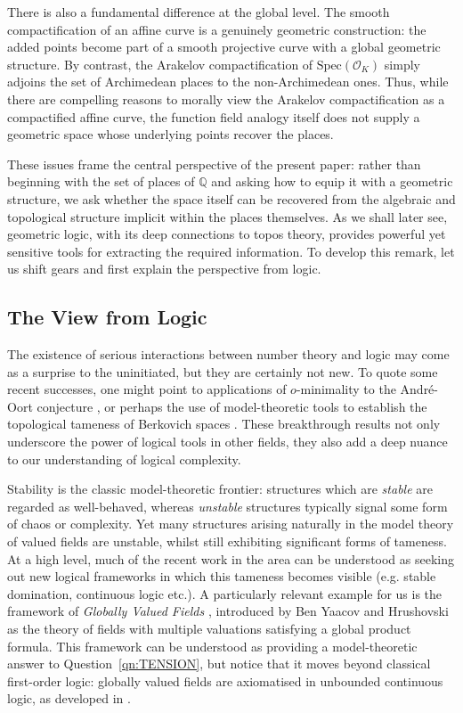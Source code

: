 \documentclass[a4paper, 11pt,reqno]{amsart}
\newcommand{\calO}{{\mathcal{O}}}
\newcommand{\Spec}{\mathrm{Spec}}
\newcommand{\Q}{\mathbb{Q}}
\newcommand{\EXP}[1]{{\color{teal} {\tiny \bf (Exposition:)} {\bf #1}}}
\begin{document}
 There is also a fundamental difference at the global level. The smooth compactification of an affine curve is a genuinely geometric construction: the added points become part of a smooth projective curve with a global geometric structure. By contrast, the Arakelov compactification of $\Spec(\calO_K)$ simply adjoins the set of Archimedean places to the non-Archimedean ones. Thus, while there are compelling reasons to morally view the Arakelov compactification as a compactified affine curve, the function field analogy itself does not supply a geometric space whose underlying points recover the places. 
 
 

These issues frame the central perspective of the present paper: rather than beginning with the set of places of $\Q$ and asking how to equip it with a geometric structure, we ask whether the space itself can be recovered from the algebraic and topological structure implicit within the places themselves. As we shall later see, geometric logic, with its deep connections to topos theory, provides powerful yet sensitive tools for extracting the required information. To develop this remark, let us shift gears and first explain the perspective from logic.

\subsection{The View from Logic} The existence of serious interactions between number theory and logic may come as a surprise to the uninitiated, but they are certainly not new.  To quote some recent successes, one might point to applications of $o$-minimality to the Andr\'{e}-Oort conjecture \cite{Pil11,Tsi18}, or perhaps the use of model-theoretic tools to establish the topological tameness of Berkovich spaces \cite{HruLoe}. These breakthrough results not only underscore the power of logical tools in other fields, they also add a deep nuance to our understanding of logical complexity. 

Stability is the classic model-theoretic frontier: structures which are {\em stable} are regarded as well-behaved, whereas {\em unstable} structures typically signal some form of chaos or complexity. Yet many structures arising naturally in the model theory of valued fields are unstable, whilst still exhibiting significant forms of tameness. At a high level, much of the recent work in the area can be understood as seeking out new logical frameworks in which this tameness becomes visible (e.g. stable domination, continuous logic etc.). A particularly relevant example for us is the framework of {\em Globally Valued Fields} \cite{GVF}, introduced by Ben Yaacov and Hrushovski as the theory of fields with multiple valuations satisfying a global product formula. This framework can be understood as providing a model-theoretic answer to Question~\ref{qn:TENSION}, but notice that it moves beyond classical first-order logic: globally valued fields are axiomatised in unbounded continuous logic, as developed in \cite{BY08}. %
\end{document}
